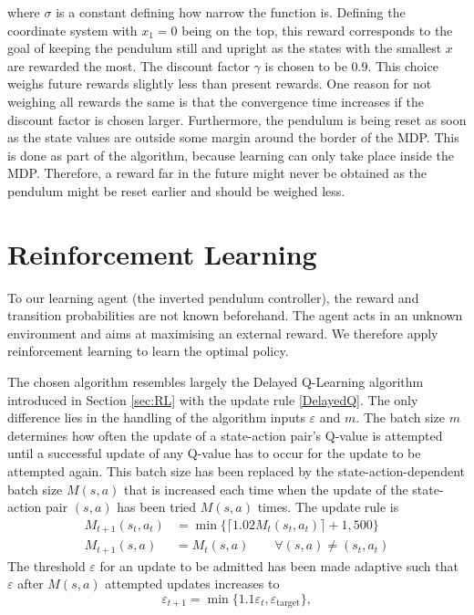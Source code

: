 \documentclass[../main.tex]{subfiles}
\begin{document}
where $\sigma$ is a constant defining how narrow the function is. Defining the coordinate system with $x_1 = 0$ being on the top, this reward corresponds to the goal of keeping the pendulum still and upright as the states with the smallest $x$ are rewarded the most. The discount factor $\gamma$ is chosen to be $0.9$. This choice weighs future rewards slightly less than present rewards. One reason for not weighing all rewards the same is that the convergence time increases if the discount factor is chosen larger. Furthermore, the pendulum is being reset as soon as the state values are outside some margin around the border of the MDP. This is done as part of the algorithm, because learning can only take place inside the MDP. Therefore, a reward far in the future might never be obtained as the pendulum might be reset earlier and should be weighed less.
\section{Reinforcement Learning}
To our learning agent (the inverted pendulum controller), the reward and transition probabilities are not known beforehand. The agent acts in an unknown environment and aims at maximising an external reward. We therefore apply reinforcement learning to learn the optimal policy. 

The chosen algorithm resembles largely the Delayed Q-Learning algorithm introduced in Section \ref{sec:RL} with the update rule \eqref{DelayedQ}. The only difference lies in the handling of the algorithm inputs $\varepsilon$ and $m$. The batch size $m$ determines how often the update of a state-action pair's Q-value is attempted until a successful update of any Q-value has to occur for the update to be attempted again. This batch size has been replaced by the state-action-dependent batch size $M(s,a)$ that is increased each time when the update of the state-action pair $(s,a)$ has been tried $M(s,a)$ times. The update rule is 
\begin{align}
    M_{t+1}(s_t,a_t) &= \min\{\lceil1.02M_t(s_t,a_t)\rceil+1, 500\}\\
    M_{t+1}(s,a) &= M_t(s,a) \qquad \forall (s,a) \neq (s_t,a_t)
\end{align}
The threshold $\varepsilon$ for an update to be admitted has been made adaptive such that $\varepsilon$ after $M(s,a)$ attempted updates increases to 
\begin{equation}
    \varepsilon_{t+1} = \min\{1.1 \varepsilon_t, \varepsilon_{\text{target}}\}, 
\end{equation}
\end{document}
